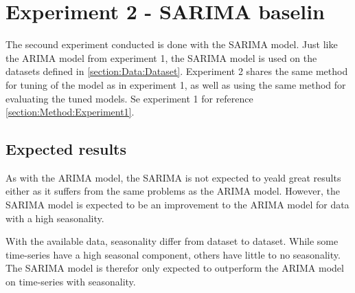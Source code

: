\section{Experiment 2 - SARIMA baselin}
\label{section:Method:Experiment2}

The secound experiment conducted is done with the SARIMA model.
Just like the ARIMA model from experiment 1, the SARIMA model is used on the datasets defined in \cref{section:Data:Dataset}.
Experiment 2 shares the same method for tuning of the model as in experiment 1,
as well as using the same method for evaluating the tuned models.
Se experiment 1 for reference \cref{section:Method:Experiment1}.

\subsection{Expected results}
As with the ARIMA model, the SARIMA is not expected to yeald great results either as it suffers from the same problems as the ARIMA model.
However, the SARIMA model is expected to be an improvement to the ARIMA model for data with a high seasonality.

With the available data, seasonality differ from dataset to dataset. While some time-series have a high seasonal component,
others have little to no seasonality.
The SARIMA model is therefor only expected to outperform the ARIMA model on time-series with seasonality.
